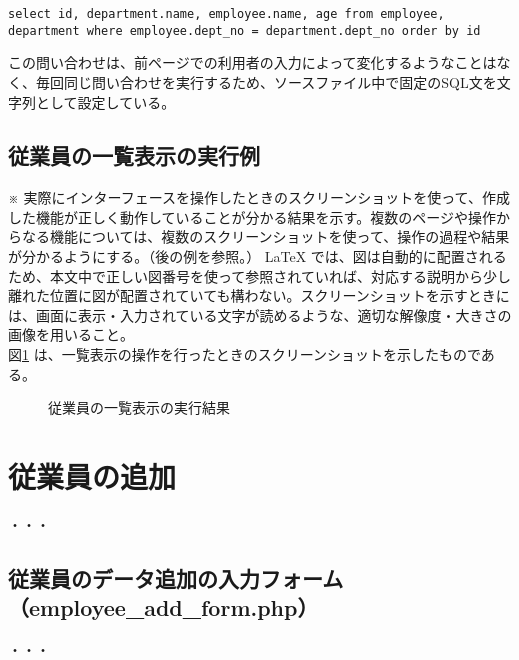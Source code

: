 \documentclass[a4j,12pt]{jreport}
\begin{document}
\begin{lstlisting}[caption=従業員の一覧表示のためのSQL]
select id, department.name, employee.name, age from employee, department where employee.dept_no = department.dept_no order by id
\end{lstlisting}

この問い合わせは、前ページでの利用者の入力によって変化するようなことはなく、毎回同じ問い合わせを実行するため、ソースファイル中で固定のSQL文を文字列として設定している。




\subsection{従業員の一覧表示の実行例}

※ 実際にインターフェースを操作したときのスクリーンショットを使って、作成した機能が正しく動作していることが分かる結果を示す。複数のページや操作からなる機能については、複数のスクリーンショットを使って、操作の過程や結果が分かるようにする。（後の例を参照。） LaTeX では、図は自動的に配置されるため、本文中で正しい図番号を使って参照されていれば、対応する説明から少し離れた位置に図が配置されていても構わない。スクリーンショットを示すときには、画面に表示・入力されている文字が読めるような、適切な解像度・大きさの画像を用いること。\\

図\ref{fig:example_list1} は、一覧表示の操作を行ったときのスクリーンショットを示したものである。

\begin{figure}[h]
	\begin{center}
	\end{center}
	\caption{従業員の一覧表示の実行結果
	}
	\label{fig:example_list1}
\end{figure}


\section{従業員の追加}

・・・

\subsection{従業員のデータ追加の入力フォーム（employee\_add\_form.php）}

・・・
\end{document}
